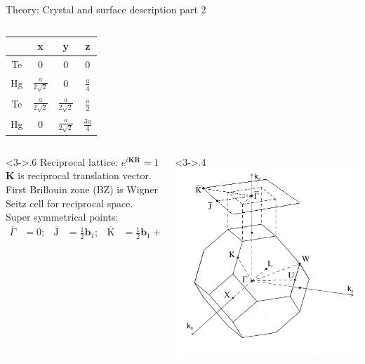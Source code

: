 \begin{frame}{Theory: Crystal and surface description part 2}
\begin{columns}
\begin{column}
{\begin{tabular}{c c c c}
				\hline
				& \textbf{x} & \textbf{y} & \textbf{z}\\ 
				\hline
				\vspace{0.2cm} 
				Te & $0$ & $0$ & $0$ \\
				\vspace{0.2cm}
				Hg & $\frac{a}{2\sqrt{2}}$ & $0$ & $\frac{a}{4}$ \\
				\vspace{0.2cm}
				Te & $\frac{a}{2\sqrt{2}}$ & $\frac{a}{2\sqrt{2}}$ & $\frac{a}{2}$ \\
				\vspace{0.2cm}
				Hg & $0$ & $\frac{a}{2\sqrt{2}}$ & $\frac{3a}{4}$
			\end{tabular}
		}
		\end{column}
	\end{columns}
	\begin{columns}
		\begin{column}<3->{.6\linewidth}
			Reciprocal lattice: $e^{i\boldsymbol{K}\boldsymbol{R}} = 1$\\
			$\boldsymbol{K}$ is reciprocal translation vector.\\
			First Brillouin zone (BZ) is Wigner Seitz cell for reciprocal space.\\
			Super symmetrical points:\vspace{-.3cm}
			\begin{align*}
			\overline{\Gamma}&= 0;&
			\overline{\text{J}} &= \frac{1}{2} \boldsymbol{b}_1 ;&
			\overline{\text{K}}&= \frac{1}{2} \boldsymbol{b}_1 + \frac{1}{2} \boldsymbol{b}_2 
			\end{align*}
		\end{column}
		\begin{column}<3->{.4\linewidth}
			\includegraphics[width=\linewidth]{andere_bilder/brillouin_zone_001_2}

\end{column}
\end{columns}
\end{frame}
